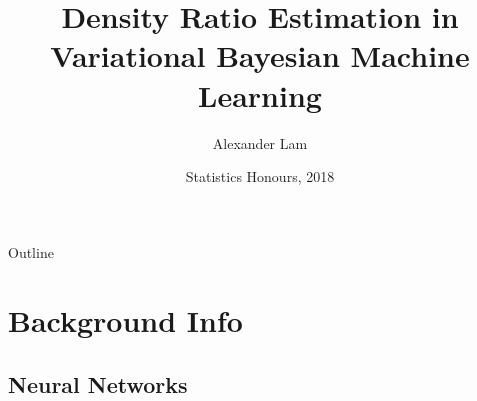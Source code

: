 \documentclass[handout]{beamer}
\title{Density Ratio Estimation in Variational Bayesian Machine Learning}
\author{Alexander Lam}
\institute[UNSW] %
{
  Department of Mathematics and Statistics\\
  UNSW
  }
\date{Statistics Honours, 2018}
\begin{document}
\begin{frame}
  \titlepage
\end{frame}

\begin{frame}{Outline}
  \tableofcontents
\end{frame}

\section{Background Info}

\subsection{Neural Networks}
\end{document}
